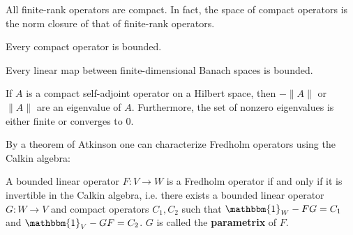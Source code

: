     \begin{property}
        All finite-rank operators are compact. In fact, the space of compact operators is the norm closure of that of finite-rank operators.
    \end{property}

    \begin{property}
        Every compact operator is bounded.
    \end{property}
    \begin{result}
        Every linear map between finite-dimensional Banach spaces is bounded.
    \end{result}

    \begin{property}
        If $A$ is a compact self-adjoint operator on a Hilbert space, then $-\|A\|$ or $\|A\|$ are an eigenvalue of $A$. Furthermore, the set of nonzero eigenvalues is either finite or converges to 0.
    \end{property}



    By a theorem of Atkinson one can characterize Fredholm operators using the Calkin algebra:
    \begin{property}[Atkinson]
        A bounded linear operator $F:V\rightarrow W$ is a Fredholm operator if and only if it is invertible in the Calkin algebra, i.e. there exists a bounded linear operator $G:W\rightarrow V$ and compact operators $C_1,C_2$ such that $\mathbbm{1}_W-FG=C_1$ and $\mathbbm{1}_V-GF=C_2$. $G$ is called the \textbf{parametrix} of $F$.
    \end{property}


